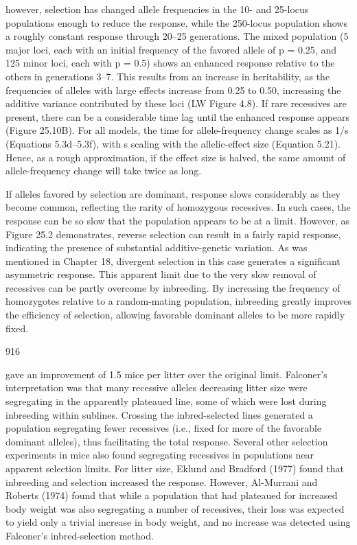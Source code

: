 \documentclass{article}
\begin{document}
however, selection has changed allele frequencies in the 10- and 25-locus populations enough to reduce the response, while the 250-locus population shows a roughly constant response through 20–25 generations. The mixed population (5 major loci, each with an initial frequency of the favored allele of p = 0.25, and 125 minor loci, each with p = 0.5) shows an enhanced response relative to the others in generations 3–7. This results from an increase in heritability, as the frequencies of alleles with large effects increase from 0.25 to 0.50, increasing the additive variance contributed by these loci (LW Figure 4.8). If rare recessives are present, there can be a considerable time lag until the enhanced response appears (Figure 25.10B). For all models, the time for allele-frequency change scales as 1/s (Equations 5.3d–5.3f), with s scaling with the allelic-effect size (Equation 5.21). Hence, as a rough approximation, if the effect size is halved, the same amount of allele-frequency change will take twice as long.

If alleles favored by selection are dominant, response slows considerably as they become common, reflecting the rarity of homozygous recessives. In such cases, the response can be so slow that the population appears to be at a limit. However, as Figure 25.2 demonstrates, reverse selection can result in a fairly rapid response, indicating the presence of substantial additive-genetic variation. As was mentioned in Chapter 18, divergent selection in this case generates a significant asymmetric response. This apparent limit due to the very slow removal of recessives can be partly overcome by inbreeding. By increasing the frequency of homozygotes relative to a random-mating population, inbreeding greatly improves the efficiency of selection, allowing favorable dominant alleles to be more rapidly fixed.

916

gave an improvement of 1.5 mice per litter over the original limit. Falconer's interpretation was that many recessive alleles decreasing litter size were segregating in the apparently plateaued line, some of which were lost during inbreeding within sublines. Crossing the inbred-selected lines generated a population segregating fewer recessives (i.e., fixed for more of the favorable dominant alleles), thus facilitating the total response. Several other selection experiments in mice also found segregating recessives in populations near apparent selection limits. For litter size, Eklund and Bradford (1977) found that inbreeding and selection increased the response. However, Al-Murrani and Roberts (1974) found that while a population that had plateaued for increased body weight was also segregating a number of recessives, their loss was expected to yield only a trivial increase in body weight, and no increase was detected using Falconer's inbred-selection method.
\end{document}
